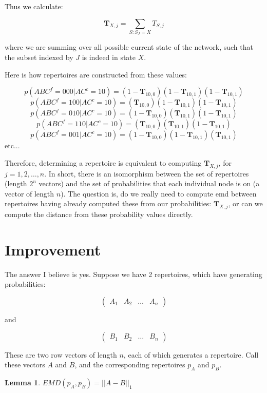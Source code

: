 \documentclass[12pt,a4paper]{article}
\newtheorem{lemma}[theorem]{Lemma}
\begin{document}
	Thus we calculate: 
	
	\[\mathbf{T}_{X, j} = \sum \limits_{S:S_J=X} T_{S, j} \]
	
	where we are summing over all possible current state of the network, such that the subset indexed by $J$ is indeed in state $X$.
	
	Here is how repertoires are constructed from these values:
	
	\[p(ABC^f = 000|AC^c = 10) = (1-\mathbf{T}_{10,0})(1-\mathbf{T}_{10,1})(1-\mathbf{T}_{10,1})\]
	\[p(ABC^f = 100|AC^c = 10) = (\mathbf{T}_{10,0})(1-\mathbf{T}_{10,1})(1-\mathbf{T}_{10,1})\]
	\[p(ABC^f = 010|AC^c = 10) = (1-\mathbf{T}_{10,0})(\mathbf{T}_{10,1})(1-\mathbf{T}_{10,1})\]
	\[p(ABC^f = 110|AC^c = 10) = (\mathbf{T}_{10,0})(\mathbf{T}_{10,1})(1-\mathbf{T}_{10,1})\]
	\[p(ABC^f = 001|AC^c = 10) = (1-\mathbf{T}_{10,0})(1-\mathbf{T}_{10,1})(\mathbf{T}_{10,1})\]
	etc...
	
	Therefore, determining a repertoire is equivalent to computing $\mathbf{T}_{X,j}$, for $j = 1, 2, \ldots, n$. In short, there is an isomorphism between the set of repertoires (length $2^n$ vectors) and the set of probabilities that each individual node is on (a vector of length $n$). The question is, do we really need to compute emd between repertoires having already computed these from our probabilities: $\mathbf{T}_{X,j}$, or can we compute the distance from these probability values directly. 
	

	
	\section{Improvement}
	The answer I believe is yes. Suppose we have 2 repertoires, which have generating probabilities:
	
	\[ \left(\begin{array}{cccc} A_{1} &A_{2} &\ldots& A_{n} \end{array} \right) \]
	
	and
	
	\[ \left(\begin{array}{cccc} B_{1} &B_{2} &\ldots& B_{n} \end{array} \right) \]
	
	These are two row vectors of length $n$, each of which generates a repertoire. Call these vectors $A$ and $B$, and the corresponding repertoires $p_A$ and $p_B$.
	
	\begin{lemma}
		$EMD(p_A, p_B) = ||A-B||_1$
	\end{lemma}
	
\end{document}
